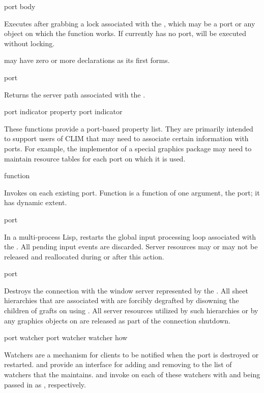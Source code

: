  {port \body body}

Executes  after grabbing a lock associated with the 
, which may be a port or any object on which the function 
works.  If  currently has no port,  will be executed
without locking.

 may have zero or more declarations as its first forms.


 {port}

Returns the server path associated with the  .

 {port indicator}
 {property port indicator}

These functions provide a port-based property list.  They are primarily intended
to support users of CLIM that may need to associate certain information with
ports.  For example, the implementor of a special graphics package may need to
maintain resource tables for each port on which it is used.

 {function}

Invokes  on each existing port.  Function is a function of one
argument, the port; it has dynamic extent.

 {port}

In a multi-process Lisp,  restarts the global input processing
loop associated with the  .  All pending input events are
discarded.  Server resources may or may not be released and reallocated during
or after this action.

 {port}

Destroys the connection with the window server represented by the 
.  All sheet hierarchies that are associated with  are
forcibly degrafted by disowning the children of grafts on  using
.  All server resources utilized by such hierarchies or
by any graphics objects on  are released as part of the connection
shutdown.

 {port watcher}
 {port watcher}
 {watcher how}

Watchers are a mechanism for clients to be notified when the port is destroyed
or restarted.   and  provide an interface for
adding and removing  to the list of watchers that the 
 maintains.   and  invoke
 on each of these watchers with  and
 being passed in as , respectively.

